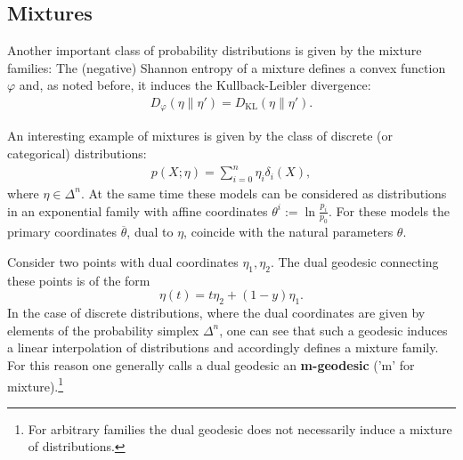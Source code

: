 \subsection{Mixtures}

    Another important class of probability distributions is given by the mixture families:
    The (negative) Shannon entropy of a mixture defines a convex function $\varphi$ and, as noted before, it induces the Kullback-Leibler divergence:
    \begin{gather}
        D_\varphi(\eta\|\eta') = D_\mathrm{KL}(\eta\|\eta').
    \end{gather}

    \begin{example}
        An interesting example of mixtures is given by the class of discrete (or categorical) distributions:
        \begin{gather}
            p(X;\eta) = \sum_{i=0}^n\eta_i\delta_i(X),
        \end{gather}
        where $\eta\in\Delta^n$. At the same time these models can be considered as distributions in an exponential family with affine coordinates $\theta^i:=\ln\frac{p_i}{p_0}$. For these models the primary coordinates $\overline{\theta}$, dual to $\eta$, coincide with the natural parameters $\theta$.
    \end{example}

    Consider two points with dual coordinates $\eta_1,\eta_2$. The dual geodesic connecting these points is of the form \[\eta(t) = t\eta_2 + (1-y)\eta_1.\] In the case of discrete distributions, where the dual coordinates are given by elements of the probability simplex $\Delta^n$, one can see that such a geodesic induces a linear interpolation of distributions and accordingly defines a mixture family. For this reason one generally calls a dual geodesic an \textbf{m-geodesic} ('m' for mixture).\footnote{For arbitrary families the dual geodesic does not necessarily induce a mixture of distributions.}

